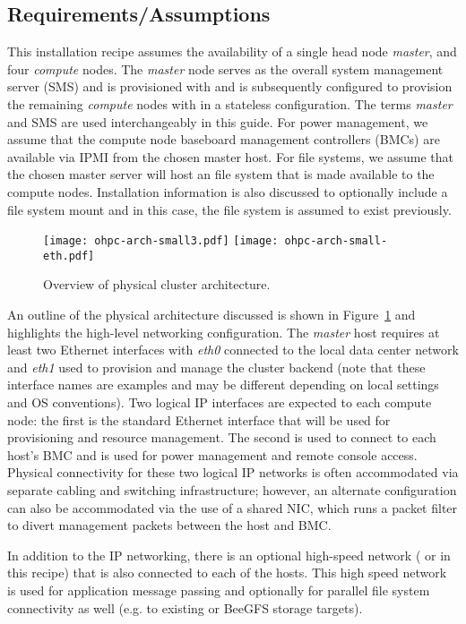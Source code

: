 \subsection{Requirements/Assumptions}
This installation recipe assumes the availability of a single head node {\em
 master}, and four {\em compute} nodes. The {\em master} node serves as the
overall system management server (SMS) and is provisioned with \baseOS{} and is
subsequently configured to provision the remaining {\em compute} nodes with
\provisioner{} in a stateless configuration. The terms {\em master} and SMS are
used interchangeably in this guide. For power management, we assume that
the compute node baseboard management controllers (BMCs) are available via IPMI
from the chosen master host. For file systems, we assume that the chosen master
server will host an \NFS{} file system that is made available to the compute
nodes. Installation information is also discussed to optionally include a
\Lustre{} file system mount and in this case, the \Lustre{} file system is
assumed to exist previously.

\begin{figure}[hbt]
\center
{}
\texttt{[image: ohpc-arch-small3.pdf]}
\fi
{}
\texttt{[image: ohpc-arch-small-eth.pdf]}
\fi
\vspace*{-0.2cm}
\caption{Overview of physical cluster architecture.} \label{fig:physical_arch}
\end{figure}
\mbox{}

\vspace*{0.5cm}

An outline of the physical architecture discussed is shown in
Figure~\ref{fig:physical_arch} and highlights the high-level networking
configuration. The {\em master} host requires at least two Ethernet interfaces
with {\em eth0} connected to the local data center network and {\em eth1} used
to provision and manage the cluster backend (note that these interface names
are examples and may be different depending on local settings and OS
conventions). Two logical IP interfaces are expected to each compute node: the
first is the standard Ethernet interface that will be used for provisioning and
resource management. The second is used to connect to each host's BMC and is
used for power management and remote console access. Physical connectivity for
these two logical IP networks is often accommodated via separate cabling and
switching infrastructure; however, an alternate configuration can also be
accommodated via the use of a shared NIC, which runs a packet filter to divert
management packets between the host and BMC.

In addition to the IP networking, there is an optional high-speed network
(\InfiniBand{} or \OmniPath{} in this recipe) that is also connected to each of the
hosts. This high speed network is used for application message passing and
optionally for parallel file system connectivity as well (e.g. to
existing \Lustre{} or BeeGFS storage targets).
\fi
